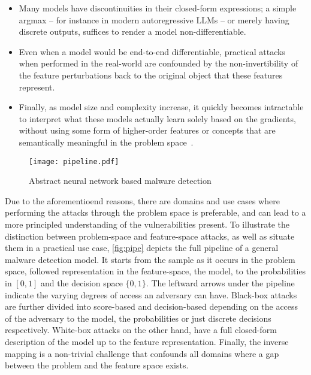 \begin{itemize}
    \item Many models have discontinuities in their closed-form expressions; a simple argmax -- for instance in modern autoregressive LLMs -- or merely having discrete outputs, suffices to render a model non-differentiable.
    \item Even when a model would be end-to-end differentiable, practical attacks when performed in the real-world are confounded by the non-invertibility of the feature perturbations back to the original object that these features represent.
    \item Finally, as model size and complexity increase, it quickly becomes intractable to interpret what these models actually learn solely based on the gradients, without using some form of higher-order features or concepts that are semantically meaningful in the problem space~\cite{kim2018interpretability}.
\end{itemize}

\begin{figure}
    \centering
    \texttt{[image: pipeline.pdf]}
    \caption{Abstract neural network based malware detection}
    \label{fig:pipe}
\end{figure}

Due to the aforementioend reasons, there are domains and use cases where performing the attacks through the problem space is preferable, and can lead to a more principled understanding of the vulnerabilities present.
To illustrate the distinction between problem-space and feature-space attacks, as well as situate them in a practical use case, \autoref{fig:pipe} depicts the full pipeline of a general malware detection model.
It starts from the sample as it occurs in the problem space, followed representation in the feature-space, the model, to the probabilities in $[0,1]$ and the decision space $\{0,1\}$.
The leftward arrows under the pipeline indicate the varying degrees of access an adversary can have.
Black-box attacks are further divided into score-based and decision-based depending on the access of the adversary to the model, the probabilities or just discrete decisions respectively.
White-box attacks on the other hand, have a full closed-form description of the model up to the feature representation.
Finally, the inverse mapping is a non-trivial challenge that confounds all domains where a gap between the problem and the feature space exists.

